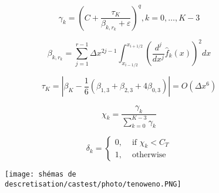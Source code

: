 \begin{equation}
\gamma_{k}=\left(C+\frac{\tau_{K}}{\beta_{k, r_{k}}+\varepsilon}\right)^{q}, k=0, \ldots, K-3
\end{equation}

\begin{equation}
\beta_{k, r_{k}}=\sum_{j=1}^{r-1} \Delta x^{2 j-1} \int_{x_{i-1 / 2}}^{x_{i+1 / 2}}\left(\frac{d^{j}}{d x^{j}} \hat{f}_{k}(x)\right)^{2} d x
\end{equation}

\begin{equation}
\tau_{K}=\left|\beta_{K}-\frac{1}{6}\left(\beta_{1,3}+\beta_{2,3}+4 \beta_{0,3}\right)\right|=O\left(\Delta x^{6}\right)
\end{equation}

\begin{equation}
\chi_{k}=\frac{\gamma_{k}}{\sum_{k=0}^{K-3} \gamma_{k}}
\end{equation}

\begin{equation}
\delta_{k}=\left\{\begin{array}{ll}
0, & \text { if } \chi_{k}<C_{T} \\
1, & \text { otherwise }
\end{array}\right.
\end{equation}

\begin{figure}[H]
\begin{center}
        \texttt{[image: shémas de descretisation/castest/photo/tenoweno.PNG]}
\caption{}
\end{center}
\end{figure}
